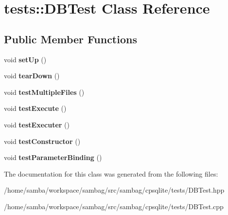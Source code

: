 \hypertarget{classtests_1_1_d_b_test}{
\section{tests::DBTest Class Reference}
\label{classtests_1_1_d_b_test}
}
\subsection*{Public Member Functions}
\begin{DoxyCompactItemize}
\item 
\hypertarget{classtests_1_1_d_b_test_a4bfdb1467c5864401873e578759a55f5}{
void {\bfseries setUp} ()}
\label{classtests_1_1_d_b_test_a4bfdb1467c5864401873e578759a55f5}

\item 
\hypertarget{classtests_1_1_d_b_test_ab763e9ff7b630ef9f35d7d28468b60c9}{
void {\bfseries tearDown} ()}
\label{classtests_1_1_d_b_test_ab763e9ff7b630ef9f35d7d28468b60c9}

\item 
\hypertarget{classtests_1_1_d_b_test_a7f6be8cb5592a09077f8247c8d1399f2}{
void {\bfseries testMultipleFiles} ()}
\label{classtests_1_1_d_b_test_a7f6be8cb5592a09077f8247c8d1399f2}

\item 
\hypertarget{classtests_1_1_d_b_test_aa75de562ee09de028dffc8a50a32d592}{
void {\bfseries testExecute} ()}
\label{classtests_1_1_d_b_test_aa75de562ee09de028dffc8a50a32d592}

\item 
\hypertarget{classtests_1_1_d_b_test_a76bc2cb9db788ac303e9c247f54ff883}{
void {\bfseries testExecuter} ()}
\label{classtests_1_1_d_b_test_a76bc2cb9db788ac303e9c247f54ff883}

\item 
\hypertarget{classtests_1_1_d_b_test_a06b42dbefad46075cf8ad9e9a6efe63c}{
void {\bfseries testConstructor} ()}
\label{classtests_1_1_d_b_test_a06b42dbefad46075cf8ad9e9a6efe63c}

\item 
\hypertarget{classtests_1_1_d_b_test_afcd62d8ae95f074f53fa0967eded7b71}{
void {\bfseries testParameterBinding} ()}
\label{classtests_1_1_d_b_test_afcd62d8ae95f074f53fa0967eded7b71}

\end{DoxyCompactItemize}


The documentation for this class was generated from the following files:\begin{DoxyCompactItemize}
\item 
/home/samba/workspace/sambag/src/sambag/cpsqlite/tests/DBTest.hpp\item 
/home/samba/workspace/sambag/src/sambag/cpsqlite/tests/DBTest.cpp\end{DoxyCompactItemize}
